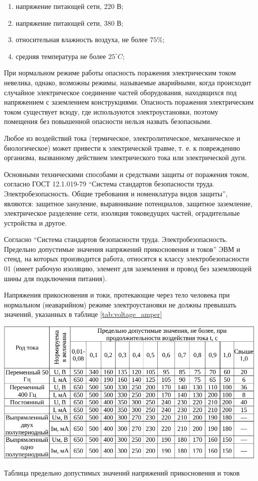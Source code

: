\begin{enumerate}
\item напряжение питающей сети, 220 В;
\item напряжение питающей сети, 380 В;
\item относительная влажность воздуха, не более $75\%$;
\item средняя температура не более $25^{\circ}C$;
\end{enumerate}
При нормальном режиме работы опасность поражения электрическим током невелика, однако, возможны режимы, называемые аварийными, когда происходит случайное электрическое соединение частей оборудования, находящихся под напряжением с заземлением конструкциями. Опасность поражения электрическим током существует всюду, где используются электроустановки, поэтому помещения без повышенной опасности нельзя назвать безопасными.

Любое из воздействий тока (термическое, электролитическое, механическое и биологическое) может привести к электрической травме, т. е. к повреждению организма, вызванному действием электрического тока или электрической дуги.

Основными техническими способами и средствами защиты от поражения током, согласно ГОСТ 12.1.019-79 ``Система стандартов безопасности труда. Электробезопасность. Общие требования и номенклатура видов защиты'', являются: защитное зануление, выравнивание потенциалов, защитное заземление, электрическое разделение сети, изоляция токоведущих частей, оградительные устройства и другое.

Согласно ``Система стандартов безопасности труда. Электробезопасность. Предельно допустимые значения напряжений прикосновения и токов'' ЭВМ и стенд, на которых производится работа, относятся к классу электробезопасности 01 (имеет рабочую изоляцию, элемент для заземления и провод без заземляющей шины для подключения питания).

Напряжения прикосновения и токи, протекающие через тело человека при нормальном (неаварийном) режиме электроустановки не должны превышать значений, указанных в таблице \ref{tab:voltage_amper}

\begin{table}[h]
\centering
\includegraphics[width=1\linewidth]{in-crop.pdf}
\caption{Таблица предельно допустимых значений напряжений прикосновения и токов}
\label{tab:voltage_amper}
\end{table}

